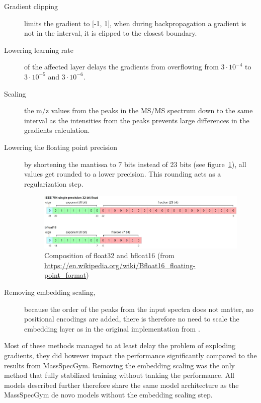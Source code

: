 \begin{description}
    \item[Gradient clipping]limits the gradient to [-1, 1],
    when during backpropagation a gradient is not in the interval,
    it is clipped to the closest boundary.
    \item[Lowering learning rate]of the affected layer delays the gradients from overflowing from $3\cdot 10^{-4}$ to $3\cdot 10^{-5}$ and $3\cdot 10^{-6}$.
    \item[Scaling] the m/z values from the peaks in the \ac{MS/MS} spectrum down to the same interval as the intensities from the peaks prevents large differences in the gradients calculation.
    \item[Lowering the floating point precision]by shortening the mantissa to 7 bits instead of 23 bits (see figure~\ref{fig:bf16}), 
    all values get rounded to a lower precision. This rounding acts as a regularization step.
    \begin{figure}[h]
        \centering
        \includegraphics[width=\linewidth]{figures/methods/bf16.JPG}
        \caption{Composition of float32 and bfloat16 (from \url{https://en.wikipedia.org/wiki/Bfloat16_floating-point_format})}
        \label{fig:bf16}
    \end{figure}
    \item[Removing embedding scaling,]because the order of the peaks from the input spectra does not matter,
    no positional encodings are added, there is therefore no need to scale the embedding layer as in the original implementation from \textcite{vaswani2017attention}.
\end{description}

Most of these methods managed to at least delay the problem of exploding gradients, they did however impact the performance significantly compared to the results from MassSpecGym.
Removing the embedding scaling was the only method that fully stabilized training without tanking the performance.
All models described further therefore share the same model architecture as the MassSpecGym de novo models without the embedding scaling step.

